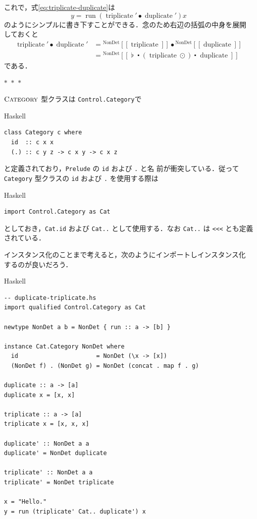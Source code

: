 \documentclass[a5paper,twoside,fleqn,draft]{jsbook}
\def\[{[\![}
\def\]{]\!]}
\newcommand{\separator}{\begin{center}$*$~$*$~$*$\end{center}}
\newcommand{\programminglanguage}[1]{\textsf{#1}}
\newcommand{\haskell}{\programminglanguage{Haskell}}
\newcommand{\code}[1]{\texttt{#1}}
\newcommand{\filename}[1]{\texttt{#1}}
\newenvironment{haskellcode}{\begin{itembox}[r]{\haskell}}{\end{itembox}}
\newcommand{\mSpecialFunc}[1]{#1}
\DeclareMathOperator{\mDuplicate}{\mSpecialFunc{duplicate}}
\DeclareMathOperator{\mRun}{\mSpecialFunc{run}}
\DeclareMathOperator{\mTriplicate}{\mSpecialFunc{triplicate}}
\DeclareMathOperator{\mComp}{\centerdot}
\DeclareMathOperator{\mCompCat}{\bullet}
\DeclareMathOperator{\mJoinList}{\flat} %
\DeclareMathOperator{\mMapList}{\odot}
\newcommand{\mValueConstructor}[1]{\mathrm{#1}}
\newcommand{\mValueWith}[2]{{}^\mValueConstructor{#1}\[#2\]}
\newcommand{\mTypeClass}[1]{\textsc{#1}} %
\newcommand{\mCategoryTypeClass}{\mTypeClass{Category}}
\begin{document}
これで，式\eqref{eq:triplicate-duplicate}は
\begin{equation}
  y=\mRun(\mTriplicate'\mCompCat\mDuplicate')x
\end{equation}
のようにシンプルに書き下すことができる．念のため右辺の括弧の中身を展開
しておくと
\begin{align}
  \mTriplicate'\mCompCat\mDuplicate'
  &=\mValueWith{NonDet}{\mTriplicate}\mCompCat\mValueWith{NonDet}{\mDuplicate}\\
  &=\mValueWith{NonDet}{\mJoinList\mComp(\mTriplicate\mMapList)\mComp\mDuplicate}
\end{align}
である．

\separator

$\mCategoryTypeClass$ 型クラスは \filename{Control.Category}で
\begin{haskellcode}
\begin{verbatim}
class Category c where
  id  :: c x x
  (.) :: c y z -> c x y -> c x z
\end{verbatim}
\end{haskellcode}
と定義されており，\filename{Prelude} の \code{id} および \code{.} と名
前が衝突している．従って \code{Category} 型クラスの \code{id} および
\code{.} を使用する際は
\begin{haskellcode}
\begin{verbatim}
import Control.Category as Cat
\end{verbatim}
\end{haskellcode}
としておき，\code{Cat.id} および \code{Cat..} として使用する．なお
\code{Cat..} は \code{<<<} とも定義されている．

インスタンス化のことまで考えると，次のようにインポートしインスタンス化
するのが良いだろう．
\begin{haskellcode}
\begin{verbatim}
-- duplicate-triplicate.hs
import qualified Control.Category as Cat

newtype NonDet a b = NonDet { run :: a -> [b] }

instance Cat.Category NonDet where
  id                      = NonDet (\x -> [x])
  (NonDet f) . (NonDet g) = NonDet (concat . map f . g)

duplicate :: a -> [a]
duplicate x = [x, x]

triplicate :: a -> [a]
triplicate x = [x, x, x]

duplicate' :: NonDet a a
duplicate' = NonDet duplicate

triplicate' :: NonDet a a
triplicate' = NonDet triplicate

x = "Hello."
y = run (triplicate' Cat.. duplicate') x
\end{verbatim}
\end{haskellcode}
\end{document}
